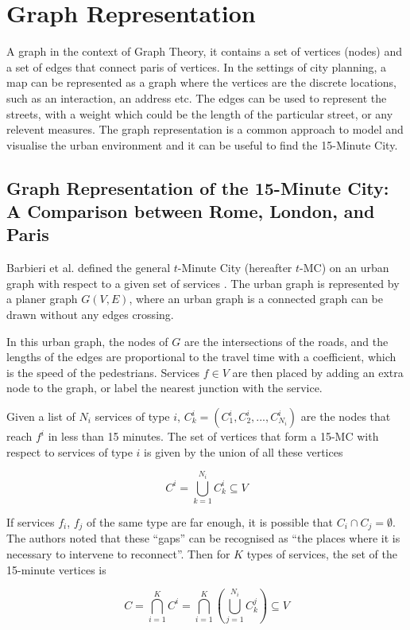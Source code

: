 \section{Graph Representation}

A graph in the context of Graph Theory, it contains a set of vertices (nodes) and a set of edges that connect paris of vertices. In the settings of city planning, a map can be represented as a graph where the vertices are the discrete locations, such as an interaction, an address etc. The edges can be used to represent the streets, with a weight which could be the length of the particular street, or any relevent measures. The graph representation is a common approach to model and visualise the urban environment and it can be useful to find the 15-Minute City.

\subsection{Graph Representation of the 15-Minute City: A Comparison between Rome, London, and Paris} \label{barbieri_graph_2023}

Barbieri et al. defined the general $t$-Minute City (hereafter $t$-MC) on an urban graph with respect to a given set of services \cite{barbieri_graph_2023}. The urban graph is represented by a planer graph $G(V,E)$, where an urban graph is a connected graph can be drawn without any edges crossing.

In this urban graph, the nodes of $G$ are the intersections of the roads, and the lengths of the edges are proportional to the travel time with a coefficient, which is the speed of the pedestrians. Services $f\in V$ are then placed by adding an extra node to the graph, or label the nearest junction with the service.

Given a list of $N_i$ services of type $i$, $C^i_k=(C^i_1,C^i_2,...,C^i_{N_i})$ are the nodes that reach $f^i$ in less than 15 minutes. The set of vertices that form a 15-MC with respect to services of type $i$ is given by the union of all these vertices

$$ C^i=\bigcup_{k=1}^{N_i}C^i_k\subseteq V $$

If services $f_i$, $f_j$ of the same type are far enough, it is possible that $C_i\cap C_j=\emptyset$. The authors noted that these “gaps” can be recognised as “the places where it is necessary to intervene to reconnect”. Then for $K$ types of services, the set of the 15-minute vertices is

$$C=\bigcap^K_{i=1}C^i=\bigcap^K_{i=1}\left(\bigcup^{N_i}_{j=1}C^j_k\right)\subseteq V$$

